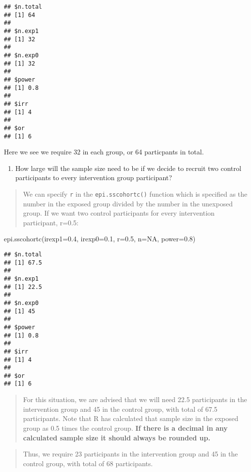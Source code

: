 \documentclass[
]{memoir}
\newenvironment{Shaded}{\begin{snugshade}}{\end{snugshade}}
\newcommand{\AttributeTok}[1]{\textcolor[rgb]{0.77,0.63,0.00}{#1}}
\newcommand{\ConstantTok}[1]{\textcolor[rgb]{0.00,0.00,0.00}{#1}}
\newcommand{\FloatTok}[1]{\textcolor[rgb]{0.00,0.00,0.81}{#1}}
\newcommand{\FunctionTok}[1]{\textcolor[rgb]{0.00,0.00,0.00}{#1}}
\newcommand{\NormalTok}[1]{#1}
\providecommand{\tightlist}{%
  \setlength{\itemsep}{0pt}\setlength{\parskip}{0pt}}
\begin{document}
\begin{verbatim}
## $n.total
## [1] 64
## 
## $n.exp1
## [1] 32
## 
## $n.exp0
## [1] 32
## 
## $power
## [1] 0.8
## 
## $irr
## [1] 4
## 
## $or
## [1] 6
\end{verbatim}

Here we see we require 32 in each group, or 64 particpants in total.

\begin{enumerate}
\def\labelenumi{\alph{enumi})}
\setcounter{enumi}{1}
\tightlist
\item
  How large will the sample size need to be if we decide to recruit two control participants to every intervention group participant?
\end{enumerate}

\begin{quote}
We can specify \texttt{r} in the \texttt{epi.sscohortc()} function which is specified as the number in the exposed group divided by the number in the unexposed group. If we want two control participants for every intervention participant, r=0.5:
\end{quote}

\begin{Shaded}
\begin{Highlighting}[]
\FunctionTok{epi.sscohortc}\NormalTok{(}\AttributeTok{irexp1=}\FloatTok{0.4}\NormalTok{, }\AttributeTok{irexp0=}\FloatTok{0.1}\NormalTok{, }\AttributeTok{r=}\FloatTok{0.5}\NormalTok{, }\AttributeTok{n=}\ConstantTok{NA}\NormalTok{, }\AttributeTok{power=}\FloatTok{0.8}\NormalTok{)}
\end{Highlighting}
\end{Shaded}

\begin{verbatim}
## $n.total
## [1] 67.5
## 
## $n.exp1
## [1] 22.5
## 
## $n.exp0
## [1] 45
## 
## $power
## [1] 0.8
## 
## $irr
## [1] 4
## 
## $or
## [1] 6
\end{verbatim}

\begin{quote}
For this situation, we are advised that we will need 22.5 participants in the intervention group and 45 in the control group, with total of 67.5 participants. Note that R has calculated that sample size in the exposed group as 0.5 times the control group. \textbf{If there is a decimal in any calculated sample size it should always be rounded up.}
\end{quote}

\begin{quote}
Thus, we require 23 participants in the intervention group and 45 in the control group, with total of 68 participants.
\end{quote}
\end{document}

